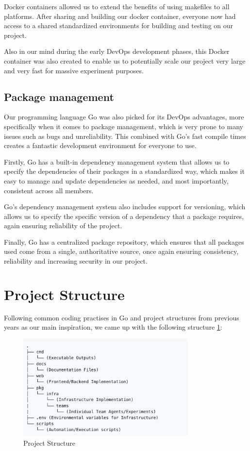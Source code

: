 Docker containers allowed us to extend the benefits of using makefiles to all platforms. After sharing and building our docker container, everyone now had access to a shared standardized environments for building and testing on our project. 

Also in our mind during the early DevOps development phases, this Docker container was also created to enable us to potentially scale our project very large and very fast for massive experiment purposes.


\subsection{Package management}

Our  programming language Go was also picked for its DevOps advantages, more specifically when it comes to package management, which is very prone to many issues such as bugs and unreliability. This combined with Go's fast compile times creates a fantastic development environment for everyone to use. 

Firstly, Go has a built-in dependency management system that allows us to specify the dependencies of their packages in a standardized way, which makes it easy to manage and update dependencies as needed, and most importantly, consistent across all members. 

Go's dependency management system also includes support for versioning, which allows us to specify the specific version of a dependency that a package requires, again ensuring reliability of the project.

Finally, Go has a centralized package repository, which ensures that all packages used come from a single, authoritative source,  once again ensuring consistency, reliability and increasing security in our project.

\newpage

\section{Project Structure}

Following common coding practises in Go and project structures from previous years as our main inspiration, we came up with the following structure \ref{fig:proj_struct}:

\begin{figure}[h]
    \centering
    \includegraphics[width=0.8\textwidth]{002_devops_project_management/figures/proj_struct.png}
    \caption{Project Structure}
    \label{fig:proj_struct}
\end{figure}